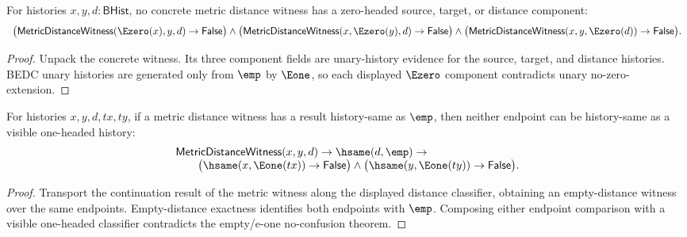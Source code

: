 
\begin{theorem}
\label{thm:metric-distance-witness-e0-component-absurd}
For histories $x,y,d:\mathsf{BHist}$, no concrete metric distance witness has
a zero-headed source, target, or distance component:
$$
\begin{array}{l}
\bigl(\mathsf{MetricDistanceWitness}(\Ezero(x),y,d)\to\mathsf{False}\bigr)
\land
\bigl(\mathsf{MetricDistanceWitness}(x,\Ezero(y),d)\to\mathsf{False}\bigr)
\land
\bigl(\mathsf{MetricDistanceWitness}(x,y,\Ezero(d))\to\mathsf{False}\bigr).
\end{array}
$$
\end{theorem}
\begin{proof}
Unpack the concrete witness. Its three component fields are unary-history
evidence for the source, target, and distance histories. BEDC unary histories
are generated only from $\emp$ by $\Eone$, so each displayed $\Ezero$ component
contradicts unary no-zero-extension.
\end{proof}

\begin{theorem}
\label{thm:metric-distance-witness-empty-distance-visible-endpoint-absurd}
For histories $x,y,d,tx,ty$, if a metric distance witness has a result
history-same as $\emp$, then neither endpoint can be history-same as a visible
one-headed history:
$$
\begin{array}{l}
\mathsf{MetricDistanceWitness}(x,y,d)\to
\hsame(d,\emp)\to\\
\qquad
\bigl(\hsame(x,\Eone(tx))\to\mathsf{False}\bigr)\land
\bigl(\hsame(y,\Eone(ty))\to\mathsf{False}\bigr).
\end{array}
$$
\end{theorem}
\begin{proof}
Transport the continuation result of the metric witness along the displayed
distance classifier, obtaining an empty-distance witness over the same
endpoints. Empty-distance exactness identifies both endpoints with $\emp$.
Composing either endpoint comparison with a visible one-headed classifier
contradicts the empty/e-one no-confusion theorem.
\end{proof}

